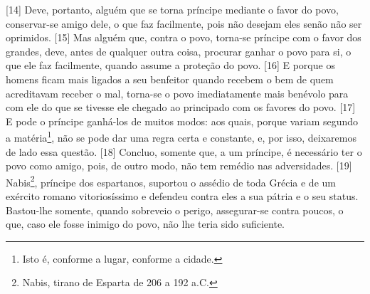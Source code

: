 {[}14{]} Deve, portanto, alguém que se torna príncipe mediante o favor
do povo, conservar-se amigo dele, o que faz facilmente, pois não desejam
eles senão não ser oprimidos. {[}15{]} Mas alguém que, contra o povo,
torna-se príncipe com o favor dos grandes, deve, antes de qualquer outra
coisa, procurar ganhar o povo para si, o que ele faz facilmente, quando
assume a proteção do povo. {[}16{]} E porque os homens ficam mais
ligados a seu benfeitor quando recebem o bem de quem acreditavam receber
o mal, torna-se o povo imediatamente mais benévolo para com ele do que
se tivesse ele chegado ao principado com os favores do povo. {[}17{]} E
pode o príncipe ganhá-los de muitos modos: aos quais, porque variam
segundo a matéria\footnote{Isto é, conforme a lugar, conforme a cidade.},
não se pode dar uma regra certa e constante, e, por isso, deixaremos de
lado essa questão. {[}18{]} Concluo, somente que, a um príncipe, é
necessário ter o povo como amigo, pois, de outro modo, não tem remédio
nas adversidades. {[}19{]} Nabis\footnote{Nabis, tirano de Esparta de
  206 a 192 a.C.}, príncipe dos espartanos, suportou o assédio de toda
Grécia e de um exército romano vitoriosíssimo e defendeu contra eles a
sua pátria e o seu status. Bastou-lhe somente, quando sobreveio o
perigo, assegurar-se contra poucos, o que, caso ele fosse inimigo do
povo, não lhe teria sido suficiente.

